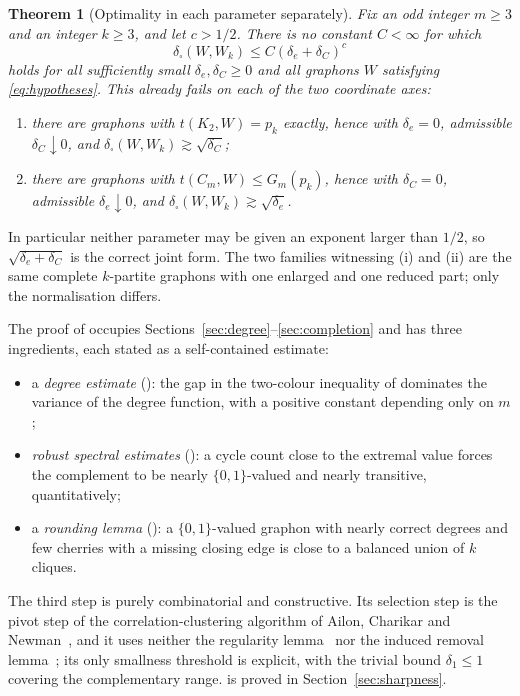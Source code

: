 \documentclass[11pt]{article}
\newtheorem{theorem}{Theorem}[section]
\theoremstyle{remark}
\newcommand{\dsq}{\delta_{\square}}
\begin{document}
\begin{theorem}[Optimality in each parameter separately]
\label{thm:sharp}
Fix an odd integer $m\geq3$ and an integer $k\geq3$, and let
$c>1/2$. There is no constant $C<\infty$ for which
\[
 \dsq(W,W_k)\leq C(\delta_e+\delta_C)^c
\]
holds for all sufficiently small $\delta_e,\delta_C\geq0$ and all
graphons $W$ satisfying \eqref{eq:hypotheses}. This already fails on each
of the two coordinate axes:
\begin{enumerate}
\item[(i)] there are graphons with $t(K_2,W)=p_k$ exactly, hence with
$\delta_e=0$, admissible $\delta_C\downarrow0$, and
$\dsq(W,W_k)\gtrsim\sqrt{\delta_C}$;
\item[(ii)] there are graphons with $t(C_m,W)\leq G_m(p_k)$, hence with
$\delta_C=0$, admissible $\delta_e\downarrow0$, and
$\dsq(W,W_k)\gtrsim\sqrt{\delta_e}$.
\end{enumerate}
\end{theorem}

In particular neither parameter may be given an exponent larger than
$1/2$, so $\sqrt{\delta_e+\delta_C}$ is the correct joint form. The two
families witnessing (i) and (ii) are the same complete $k$-partite
graphons with one enlarged and one reduced part; only the normalisation
differs.

The proof of  occupies
Sections~\ref{sec:degree}--\ref{sec:completion} and has three
ingredients, each stated as a self-contained estimate:

\begin{itemize}
\item a \emph{degree estimate} (): the gap in the
two-colour inequality of \cite[Theorem~1.3]{kim2026goodman} dominates the
variance of the degree function, with a positive constant depending only
on $m$;
\item \emph{robust spectral estimates} (): a cycle
count close to the extremal value forces the complement to be nearly
$\{0,1\}$-valued and nearly transitive, quantitatively;
\item a \emph{rounding lemma} (): a $\{0,1\}$-valued
graphon with nearly correct degrees and few cherries with a missing
closing edge is close to a balanced union of $k$ cliques.
\end{itemize}

The third step is purely combinatorial and constructive. Its selection
step is the pivot step of the correlation-clustering algorithm of Ailon,
Charikar and Newman~\cite{ailon2008aggregating}, and it uses neither the
regularity lemma~\cite{szemeredi1978regular} nor the induced removal
lemma~\cite{alon2000efficient}; its only smallness threshold
is explicit, with the trivial bound $\delta_1\leq1$ covering the
complementary range.  is proved in
Section~\ref{sec:sharpness}.
\end{document}
